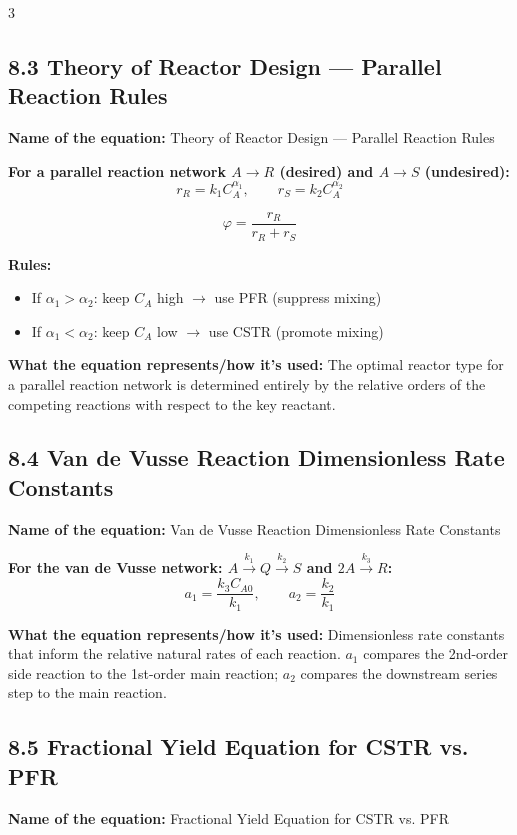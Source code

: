 \documentclass[8pt]{extarticle}
\begin{document}
\begin{multicols*}{3}
\subsection*{8.3 Theory of Reactor Design --- Parallel Reaction Rules}

\textbf{Name of the equation:} Theory of Reactor Design --- Parallel Reaction Rules

\textbf{For a parallel reaction network \(A\to R\) (desired) and \(A\to S\) (undesired):}
\[
r_R=k_1C_A^{\alpha_1}, \qquad r_S=k_2C_A^{\alpha_2}
\]

\[
\varphi=\frac{r_R}{r_R+r_S}
\]

\textbf{Rules:}
\begin{itemize}
\item If \(\alpha_1>\alpha_2\): keep \(C_A\) high \(\rightarrow\) use PFR (suppress mixing)
\item If \(\alpha_1<\alpha_2\): keep \(C_A\) low \(\rightarrow\) use CSTR (promote mixing)
\end{itemize}

\textbf{What the equation represents/how it's used:} The optimal reactor type for a parallel reaction network is determined entirely by the relative orders of the competing reactions with respect to the key reactant.

\subsection*{8.4 Van de Vusse Reaction Dimensionless Rate Constants}

\textbf{Name of the equation:} Van de Vusse Reaction Dimensionless Rate Constants

\textbf{For the van de Vusse network: \(A\xrightarrow{k_1}Q\xrightarrow{k_2}S\) and \(2A\xrightarrow{k_3}R\):}
\[
a_1=\frac{k_3C_{A0}}{k_1}, \qquad a_2=\frac{k_2}{k_1}
\]

\textbf{What the equation represents/how it's used:} Dimensionless rate constants that inform the relative natural rates of each reaction. \(a_1\) compares the 2nd-order side reaction to the 1st-order main reaction; \(a_2\) compares the downstream series step to the main reaction.

\subsection*{8.5 Fractional Yield Equation for CSTR vs. PFR}

\textbf{Name of the equation:} Fractional Yield Equation for CSTR vs. PFR


\end{multicols*}
\end{document}

